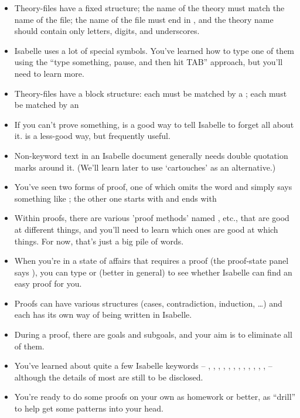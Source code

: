 \begin{itemize}
    \item Theory-files have a fixed structure; the name of the theory must match the name of the file; the name of the file must end in , and the theory name should contain only letters, digits, and underscores. 
    \item Isabelle uses a lot of special symbols. You've learned how to type one of them using the ``type something, pause, and then hit TAB'' approach, but you'll need to learn more. 
    \item Theory-files have a block structure: each  must be matched by a ; each  must be matched by an 
    \item If you can't prove something,  is a good way to tell Isabelle to forget all about it.  is a less-good way, but frequently useful.
    \item Non-keyword text in an Isabelle document generally needs double quotation marks around it. (We'll learn later to use `cartouches' as an alternative.)
    \item You've seen two forms of proof, one of which omits the word  and simply says something like ; the other one starts with  and ends with 
    \item Within proofs, there are various 'proof methods' named , etc., that are good at different things, and you'll need to learn which ones are good at which things. For now, that's just a big pile of words. 
    \item When you're in a state of affairs that requires a proof (the proof-state panel says ), you can type  or (better in general)  to see whether Isabelle can find an easy proof for you. 
    \item Proofs can have various structures (cases, contradiction, induction, \ldots ) and each has its own way of being written in Isabelle. 
    \item During a proof, there are goals and subgoals, and your aim is to eliminate all of them. 
    \item You've learned about quite a few Isabelle keywords -- , , , , , , , , , , , ,  -- although the details of most are still to be disclosed. 
    \item You're ready to do some proofs on your own as homework or better, as ``drill'' to help get some patterns into your head. 
\end{itemize}


